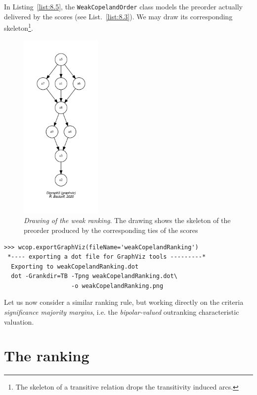 In Listing~\vref{list:8.5}, the \texttt{WeakCopelandOrder} class models the preorder actually delivered by the \Copeland scores (see List.~\vref{list:8.3}). We may draw its corresponding skeleton\footnote{The skeleton of a transitive relation drops the transitivity induced arcs.}.
\begin{figure}[ht]
\sidecaption[t]
\includegraphics[width=4cm]{Figures/8-2-weakCopelandRanking.pdf}
\caption[Drawing of the weak \Copeland ranking]{\emph{Drawing of the weak \Copeland ranking}. The drawing shows the skeleton of the preorder produced by the corresponding ties of the \Copeland scores}
\label{fig:8.2}       %
\end{figure}
\begin{lstlisting}
>>> wcop.exportGraphViz(fileName='weakCopelandRanking')
 *---- exporting a dot file for GraphViz tools ---------*
  Exporting to weakCopelandRanking.dot
  dot -Grankdir=TB -Tpng weakCopelandRanking.dot\
                   -o weakCopelandRanking.png
\end{lstlisting}

Let us now consider a similar ranking rule, but working directly on the criteria \emph{significance majority margins}, i.e. the \emph{bipolar-valued} outranking characteristic valuation.

\section{The \NetFlows ranking}
\label{sec:8.3}

